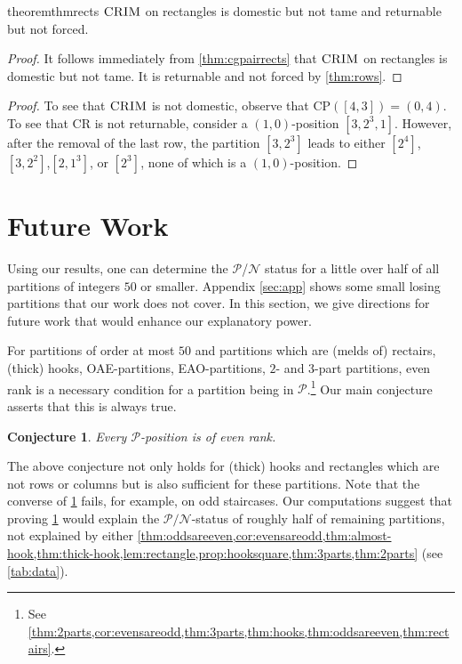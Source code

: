 \documentclass[pdflatex,sn-mathphys-num]{sn-jnl}%
\theoremstyle{thmstyleone}%
\theoremstyle{thmstyletwo}%
\theoremstyle{thmstylethree}%
\newtheorem{conj}{Conjecture}
\newcommand{\p}{\mathcal P}
\newcommand{\n}{\mathcal N}
\newcommand{\crim}{\textsc{CRIM} \/}
\newcommand{\cp}{\mathrm{CP}}
\begin{document}
\begin{restatable}{theorem}{thmrects} \label{thm:rects}
    $\crim$ on rectangles is domestic but not tame and returnable but not forced. 
\end{restatable}
\begin{proof}
    It follows immediately from \cref{thm:cgpairrects} that $\crim$ on rectangles is domestic but not tame. It is returnable and not forced by \cref{thm:rows}. 
\end{proof}

\thmCGHmain*
\begin{proof}
To see that $\crim$ is not domestic, observe that $\cp([4, 3]) = (0, 4)$.  To see that CR is not returnable, consider a $(1,0)$-position  $[3, 2^3, 1]$. 
However, after the removal of the last row, the partition $[3, 2^3]$ leads to either $[2^4]$, $[3,2^2]$,$[2,1^3]$, or $[2^3]$, none of which is a $(1,0)$-position.   
\end{proof}

\section{Future Work}  

\label{sec:future} 
Using our results, one can determine the $\p$/$\n$ status for a little over half of all partitions of integers $50$ or smaller. Appendix \ref{sec:app} shows some small losing partitions that our work does not cover.  In this section, we give directions for future work that would enhance our explanatory power. 

For partitions of order at most  $50$ and partitions which are (melds of) rectairs, (thick) hooks, OAE-partitions, EAO-partitions, $2$- and $3$-part partitions, 
even rank is a necessary condition for a partition being in $\p$.\footnote{See \cref{thm:2parts,cor:evensareodd,thm:3parts,thm:hooks,thm:oddsareeven,thm:rectairs}.} 
Our main conjecture asserts that this is always true.

\begin{conj}\label{conj:main}
Every $\p$-position is of even rank.
\end{conj}

The above conjecture  not only holds for (thick) hooks and rectangles which are not rows or columns but is also sufficient for these partitions. 
Note that the converse of \cref{conj:main} fails, for example, on odd staircases. 
%
Our computations suggest that proving \cref{conj:main}  would explain the $\p/\n$-status of roughly half of remaining partitions, not explained by either \cref{thm:oddsareeven,cor:evensareodd,thm:almost-hook,thm:thick-hook,lem:rectangle,prop:hooksquare,thm:3parts,thm:2parts} (see \cref{tab:data}).
\end{document}

